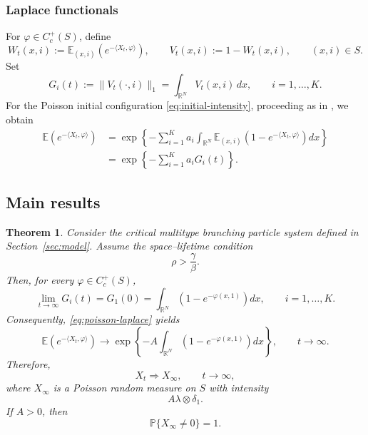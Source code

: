 \documentclass[reqno,final,11pt]{amsart}
\newcommand{\R}{\mathbb R}
\newcommand{\E}{\mathbb E}
\newcommand{\Pbb}{\mathbb P}
\newcommand{\ip}[2]{\langle #1,#2\rangle}
\theoremstyle{plain}
\newtheorem{theorem}{Theorem}[section]
\theoremstyle{definition}
\theoremstyle{remark}
\numberwithin{equation}{section}
\begin{document}
\subsubsection{Laplace functionals}

For \(\varphi\in C_c^+(S)\), define
\[
  W_t(x,i):=\E_{(x,i)}\left(e^{-\ip{X_t}{\varphi}}\right),
  \qquad
  V_t(x,i):=1-W_t(x,i),
  \qquad (x,i)\in S.
\]
Set
\begin{equation}\label{eq:Gi-def}
  G_i(t):=\|V_t(\cdot,i)\|_1
  =\int_{\R^N}V_t(x,i)\,dx,
  \qquad i=1,\dots,K.
\end{equation}
For the Poisson initial configuration \eqref{eq:initial-intensity}, proceeding as in \cite[Proposition~2.1(b)]{KLRFiniteMean}, we obtain
\begin{equation}\label{eq:poisson-laplace}
\begin{split}
  \E\left(e^{-\ip{X_t}{\varphi}}\right)
  &=
  \exp\left\{
    -\sum_{i=1}^K a_i
    \int_{\R^N}
    \E_{(x,i)}\left(1-e^{-\ip{X_t}{\varphi}}\right)dx
  \right\}\\
  &=
  \exp\left\{-\sum_{i=1}^K a_iG_i(t)\right\}.
\end{split}
\end{equation}
\subsection{Main results}\label{subsec:main-theorem}

\begin{theorem}\label{thm:main-mixed}
Consider the critical multitype branching particle system defined in Section~\ref{sec:model}. Assume the space--lifetime condition
\begin{equation}\label{eq:main-dim-condition}
  \rho>\frac{\gamma}{\beta}.
\end{equation}
Then, for every \(\varphi\in C_c^+(S)\),
\begin{equation}\label{eq:Gi-main-limit}
  \lim_{t\to\infty}G_i(t)
  =
  G_1(0)
  =
  \int_{\R^N}\left(1-e^{-\varphi(x,1)}\right)dx,
  \qquad i=1,\dots,K.
\end{equation}
Consequently, \eqref{eq:poisson-laplace} yields
\begin{equation}\label{eq:laplace-main-limit}
  \E\left(e^{-\ip{X_t}{\varphi}}\right)
  \longrightarrow
  \exp\left\{
    -A\int_{\R^N}\left(1-e^{-\varphi(x,1)}\right)dx
  \right\},
  \qquad t\to\infty.
\end{equation}
Therefore,
\[
  X_t\Rightarrow X_\infty,
  \qquad t\to\infty,
\]
where \(X_\infty\) is a Poisson random measure on \(S\) with intensity
\[
  A\lambda\otimes\delta_1.
\]
If \(A>0\), then
\[
  \Pbb\{X_\infty\ne0\}=1.
\]
\end{theorem}
\end{document}
